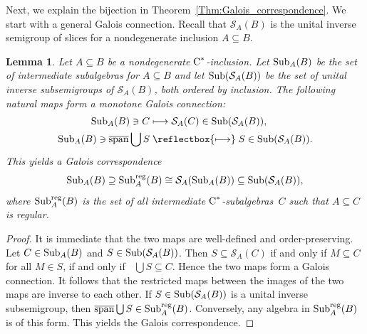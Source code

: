 \documentclass[a4paper]{amsart}
\theoremstyle{plain}
\newtheorem{lemma}[theorem]{Lemma}
\theoremstyle{definition}
\theoremstyle{remark}
\numberwithin{theorem}{section}
\numberwithin{equation}{section}
\DeclareMathOperator*{\clsp}{\overline{span}} %
\newcommand*{\nb}{\nobreakdash}
\newcommand*{\Cst}{\textup C^*}%
\newcommand*{\Slice}{\mathcal S}%
\newcommand*{\Sub}{\textup{Sub}}%
\begin{document}
Next, we explain the bijection in
Theorem~\ref{Thm:Galois_correspondence}.
We start with a general Galois connection. Recall that \(\Slice_A(B)\) is the unital inverse semigroup of slices
for a nondegenerate inclusion
\(A\subseteq B\).

\begin{lemma}
  \label{lem:Galois_connection}
  Let \(A\subseteq B\) be a nondegenerate \(\Cst\)\nb-inclusion.
  Let \(\Sub_A(B)\) be the set of intermediate subalgebras for
  \(A\subseteq B\) and let \(\Sub(\Slice_A(B))\) be the set of unital
  inverse subsemigroups of \(\Slice_A(B)\), both ordered by inclusion.
  The following natural maps form a monotone Galois connection:
  \begin{align*}
    \Sub_A(B)\ni C
    &\stackrel{}{\longmapsto} \Slice_A(C)\in \Sub(\Slice_A(B)),\\
    \Sub_A(B)\ni \clsp\bigcup S
    & \stackrel{}{\mathrel{\reflectbox{\ensuremath{\longmapsto}}}} S\in \Sub(\Slice_A(B)).
  \end{align*}
  This yields a Galois correspondence
  \[
    \Sub_A(B)\supseteq \Sub_A^{\textup{reg}}(B)
    \cong  \Slice_A(\Sub_A(B))\subseteq  \Sub(\Slice_A(B)),
  \]
  where \(\Sub_A^{\textup{reg}}(B)\) is the set of all intermediate
  \(\Cst\)\nb-subalgebras~\(C\) such that \(A\subseteq C\) is regular.
\end{lemma}

\begin{proof}
  It is immediate that the two maps are well-defined and
  order-preserving.
  Let \(C\in \Sub_A(B)\) and \(S\in \Sub(\Slice_A(B))\).
  Then \(S\subseteq \Slice_A(C)\) if and only if \(M\subseteq C\)
  for all \(M\in S\), if and only if \(\clsp\bigcup S\subseteq C\).
  Hence the two maps form a Galois connection.
  It follows that the restricted maps between the images of the two
  maps are inverse to each other.
  If \(S\in \Sub(\Slice_A(B))\) is a unital inverse subsemigroup, then
  \(\clsp\bigcup S\in \Sub_A^{\textup{reg}}(B)\).
  Conversely, any algebra in \(\Sub_A^{\textup{reg}}(B)\) is of this
  form.
  This yields the Galois correspondence.
\end{proof}
\end{document}
